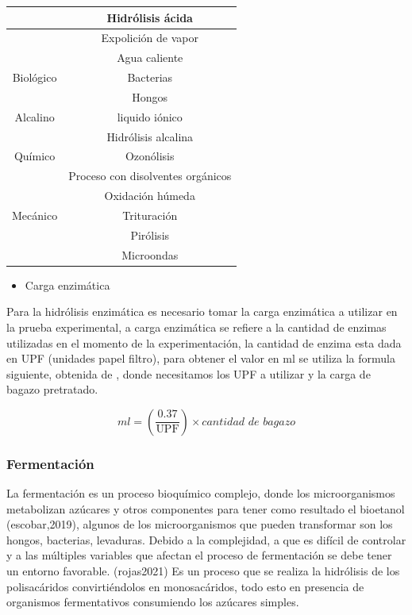 \documentclass[12pt]{article}
\begin{document}
\begin{appendix}
\begin{table}[H]
\begin{tabular}{  | c | c |}
			&   Hidrólisis ácida \\ \hline 
			
			
			& Expolición de vapor\\
			&  Agua caliente \\ \hline
			Biológico & Bacterias \\
			&  Hongos \\ \hline
			Alcalino  & liquido iónico  \\
			& Hidrólisis alcalina \\ \hline
			Químico   & Ozonólisis\\
			&  Proceso con disolventes orgánicos\\
			& Oxidación húmeda \\ \hline
			Mecánico  & Trituración \\
			&  Pirólisis \\
			&  Microondas \\ \hline
			
		\end{tabular}
		\label{tipos de pretratamientos}
		\end{table}
		
		
		
		\begin{itemize}
		\item  Carga enzimática
		\end{itemize}
		
		Para la hidrólisis enzimática es necesario tomar la carga enzimática a utilizar en la prueba experimental, a carga enzimática se refiere a la cantidad de enzimas utilizadas en el momento de la experimentación, la cantidad de enzima esta dada en UPF (unidades papel filtro),  para obtener el valor en ml se utiliza la formula siguiente, obtenida de \cite{Arturo2022}, donde necesitamos los UPF a utilizar y la carga de bagazo pretratado.
		
			\begin{equation}
			 ml = \left( \frac{0.37}{\text{UPF}} \right) \times \textit{cantidad de bagazo} 
			\end{equation}
		
		
		
		\subsubsection{Fermentación}
		La fermentación es un proceso bioquímico complejo, donde los microorganismos metabolizan azúcares y otros componentes para tener como resultado el bioetanol (escobar,2019), algunos de los microorganismos que pueden transformar son los hongos, bacterias, levaduras. Debido a la complejidad, a que es difícil de controlar y a las múltiples variables que afectan el proceso de fermentación se debe tener un entorno favorable. (rojas2021)
		Es un proceso que se realiza la hidrólisis de los polisacáridos convirtiéndolos en monosacáridos, todo esto en presencia de organismos fermentativos consumiendo los azúcares simples.
		

\end{appendix}
\end{document}
